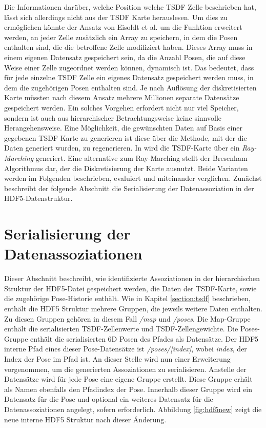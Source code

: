 Die Informationen darüber, welche Position welche TSDF Zelle beschrieben hat, lässt sich allerdings nicht aus der TSDF Karte herauslesen. Um dies zu ermöglichen könnte der Ansatz von Eisoldt et al. \cite{HATSDF} um die Funktion erweitert werden, an jeder Zelle zusätzlich ein Array zu speichern, in dem die Posen enthalten sind, die die betroffene Zelle modifiziert haben. Dieses Array muss in einem eigenen Datensatz gespeichert sein, da die Anzahl Posen, die auf diese Weise einer Zelle zugeordnet werden können, dynamisch ist. Das bedeutet, dass für jede einzelne TSDF Zelle ein eigenes Datensatz gespeichert werden muss, in dem die zugehörigen Posen enthalten sind. Je nach Auflösung der diskretisierten Karte müssten nach diesem Ansatz mehrere Millionen separate Datensätze gespeichert werden. Ein solches Vorgehen erfordert nicht nur viel Speicher, sondern ist auch aus hierarchischer Betrachtungsweise keine sinnvolle Herangehensweise.
Eine Möglichkeit, die gewünschten Daten auf Basis einer gegebenen TSDF Karte zu generieren ist diese über die Methode, mit der die Daten generiert wurden, zu regenerieren. In \cite{HATSDF} wird die TSDF-Karte über ein \emph{Ray-Marching} generiert. Eine alternative zum Ray-Marching stellt der Bresenham Algorithmus dar, der die Diskretisierung der Karte ausnutzt.
Beide Varianten werden im Folgenden beschrieben, evaluiert und miteinander verglichen.
Zunächst beschreibt der folgende Abschnitt die Serialisierung der Datenassoziation in der HDF5-Datenstruktur.

\section{Serialisierung der Datenassoziationen}


Dieser Abschnitt beschreibt, wie identifizierte Assoziationen in der hierarchischen Struktur der HDF5-Datei gespeichert werden, die Daten der TSDF-Karte, sowie die zugehörige Pose-Historie enthält.
Wie in Kapitel \ref{section:tsdf} beschrieben, enthält die HDF5 Struktur mehrere Gruppen, die jeweils weitere Daten enthalten. Zu diesen Gruppen gehören in diesem Fall \textit{/map} und \textit{/poses}.
Die Map-Gruppe enthält die serialisierten TSDF-Zellenwerte und TSDF-Zellengewichte. Die Poses-Gruppe enthält die serialisierten 6D Posen des Pfades als Datensätze.
Der HDF5 interne Pfad eines dieser Pose-Datensätze ist \textit{/poses/[index]}, wobei \textit{index}, der Index der Pose im Pfad ist.
An dieser Stelle wird nun einer Erweiterung vorgenommen, um die generierten Assoziationen zu serialisieren. Anstelle der Datensätze wird für jede Pose eine eigene Gruppe erstellt. Diese Gruppe erhält als Namen ebenfalls den Pfadindex der Pose. Innerhalb dieser Gruppe wird ein Datensatz für die Pose und optional ein weiteres Datensatz für die Datenassoziationen angelegt, sofern erforderlich.
Abbildung \ref{fig:hdf5new} zeigt die neue interne HDF5 Struktur nach dieser Änderung.

